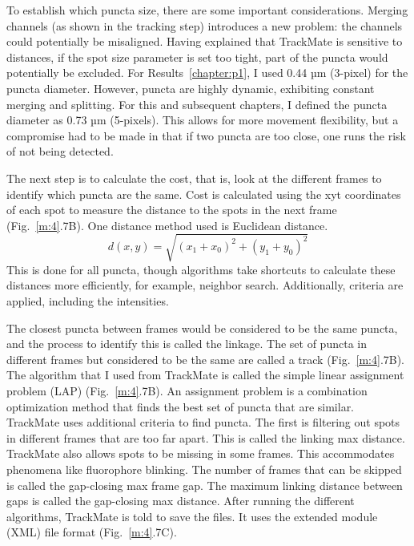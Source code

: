 To establish which puncta size, there are some important considerations. Merging channels (as shown in the tracking step) introduces a new problem: the channels could potentially be misaligned. Having explained that TrackMate is sensitive to distances, if the spot size parameter is set too tight, part of the puncta would potentially be excluded. For Results~\ref{chapter:p1}, I used 0.44 µm (3-pixel) for the puncta diameter. However, puncta are highly dynamic, exhibiting constant merging and splitting. For this and subsequent chapters, I defined the puncta diameter as 0.73 µm (5-pixels). This allows for more movement flexibility, but a compromise had to be made in that if two puncta are too close, one runs the risk of not being detected.

The next step is to calculate the cost, that is, look at the different frames to identify which puncta are the same. Cost is calculated using the xyt coordinates of each spot to measure the distance to the spots in the next frame (Fig.~\ref{m:4}.7B). One distance method used is Euclidean distance. \begin{equation*}d(x, y) = \sqrt{(x_{1} + x_{0})^2 + (y_{1} + y_{0})^2}\end{equation*} This is done for all puncta, though algorithms take shortcuts to calculate these distances more efficiently, for example, neighbor search. Additionally, criteria are applied, including the intensities.

The closest puncta between frames would be considered to be the same puncta, and the process to identify this is called the linkage. The set of puncta in different frames but considered to be the same are called a track (Fig.~\ref{m:4}.7B). The algorithm that I used from TrackMate is called the simple linear assignment problem (LAP) (Fig.~\ref{m:4}.7B). An assignment problem is a combination optimization method that finds the best set of puncta that are similar. TrackMate uses additional criteria to find puncta. The first is filtering out spots in different frames that are too far apart. This is called the linking max distance. TrackMate also allows spots to be missing in some frames. This accommodates phenomena like fluorophore blinking. The number of frames that can be skipped is called the gap-closing max frame gap. The maximum linking distance between gaps is called the gap-closing max distance. After running the different algorithms, TrackMate is told to save the files. It uses the extended module (XML) file format (Fig.~\ref{m:4}.7C).


